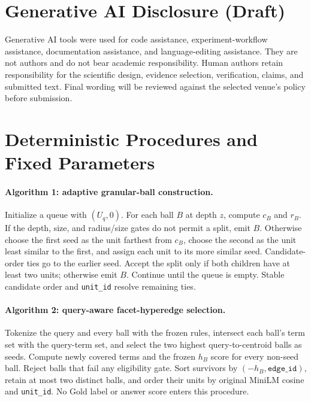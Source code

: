 \documentclass[11pt]{article}
\begin{document}
\section*{Generative AI Disclosure (Draft)}

Generative AI tools were used for code assistance, experiment-workflow
assistance, documentation assistance, and language-editing assistance. They
are not authors and do not bear academic responsibility. Human authors retain
responsibility for the scientific design, evidence selection, verification,
claims, and submitted text. Final wording will be reviewed against the selected
venue's policy before submission.



\appendix

\section{Deterministic Procedures and Fixed Parameters}

\paragraph{Algorithm 1: adaptive granular-ball construction.}
Initialize a queue with $(U_q,0)$. For each ball $B$ at depth $z$, compute
$c_B$ and $r_B$. If the depth, size, and radius/size gates do not permit a
split, emit $B$. Otherwise choose the first seed as the unit farthest from
$c_B$, choose the second as the unit least similar to the first, and assign
each unit to its more similar seed. Candidate-order ties go to the earlier
seed. Accept the split only if both children have at least two units; otherwise
emit $B$. Continue until the queue is empty. Stable candidate order and
\texttt{unit\_id} resolve remaining ties.

\paragraph{Algorithm 2: query-aware facet-hyperedge selection.}
Tokenize the query and every ball with the frozen rules, intersect each ball's
term set with the query-term set, and select the two highest
query-to-centroid balls as seeds. Compute newly covered terms and the frozen
$h_B$ score for every non-seed ball. Reject balls that fail any eligibility
gate. Sort survivors by $( -h_B,\texttt{edge\_id})$, retain at most two
distinct balls, and order their units by original MiniLM cosine and
\texttt{unit\_id}. No Gold label or answer score enters this procedure.
\end{document}
